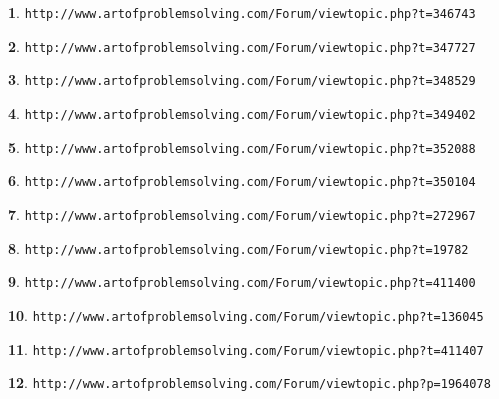 \documentclass{article}
\theoremstyle{definition}
\newtheorem{s}{}
\begin{document}
\begin{s}
\texttt{http://www.artofproblemsolving.com/Forum/viewtopic.php?t=346743}
\end{s}


\begin{s}
\texttt{http://www.artofproblemsolving.com/Forum/viewtopic.php?t=347727}
\end{s}



\begin{s}
\texttt{http://www.artofproblemsolving.com/Forum/viewtopic.php?t=348529}
\end{s}


\begin{s}
\texttt{http://www.artofproblemsolving.com/Forum/viewtopic.php?t=349402}
\end{s}





\begin{s}
\texttt{http://www.artofproblemsolving.com/Forum/viewtopic.php?t=352088}
\end{s}


\begin{s}
\texttt{http://www.artofproblemsolving.com/Forum/viewtopic.php?t=350104}
\end{s}

\begin{s}
\texttt{http://www.artofproblemsolving.com/Forum/viewtopic.php?t=272967}
\end{s}


\begin{s}
\texttt{http://www.artofproblemsolving.com/Forum/viewtopic.php?t=19782}
\end{s}





\begin{s}
\texttt{http://www.artofproblemsolving.com/Forum/viewtopic.php?t=411400}
\end{s}


\begin{s}
\texttt{http://www.artofproblemsolving.com/Forum/viewtopic.php?t=136045}
\end{s}


\begin{s}
\texttt{http://www.artofproblemsolving.com/Forum/viewtopic.php?t=411407}
\end{s}


\begin{s}
\texttt{http://www.artofproblemsolving.com/Forum/viewtopic.php?p=1964078}
\end{s}
\end{document}
